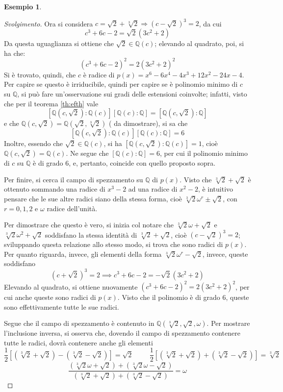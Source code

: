 \documentclass[11pt, a4paper]{scrartcl}
\newenvironment{svolgimento}{\renewcommand\qedsymbol{$\blacksquare$}\begin{proof}[Svolgimento]}{\end{proof}}
\theoremstyle{definition}
\newtheorem{esempio}{Esempio}
\numberwithin{esempio}{section}
\theoremstyle{definition}
\numberwithin{obs}{section}
\numberwithin{nota}{section}
\numberwithin{equation}{subsection}
\begin{document}
\begin{esempio}
\begin{svolgimento}
		Ora si considera $c=\sqrt{2} +\sqrt[3]{2} \Rightarrow (c-\sqrt{2} )^3 = 2$, da cui
		\[
		c^3 + 6c - 2 = \sqrt{2} (3c^2  +2)
		\] 
		Da questa uguaglianza si ottiene che $\sqrt{2} \in \mathbb{Q}(c)$; elevando al quadrato, poi, si ha che:
		\[
			(c^3 + 6c - 2) ^2 = 2(3c^2 + 2)^2
		\] 
		Si \`e trovato, quindi, che $c$ \`e radice di $p(x) = x^6 - 6x^4 - 4 x^3 + 12x^2-24x - 4$.
		Per capire se questo \`e irriducibile, quindi per capire se \`e polinomio minimo di $c$ su $\mathbb{Q}$, si pu\`o fare un'osservazione sui gradi delle estensioni coinvolte; infatti, visto che per il teorema \ref{th:efth} vale
		\[
			[\mathbb{Q}(c,\sqrt{2} ) : \mathbb{Q}(c)] [\mathbb{Q}(c):\mathbb{Q}] = [\mathbb{Q}(c,\sqrt{2} ) : \mathbb{Q}]
		\] 
		e che $\mathbb{Q}(c,\sqrt{2} ) = \mathbb{Q}(\sqrt{2} ,\sqrt[3]{2} )$ ({\color{red} da dimostrare}), si sa che
\[
[\mathbb{Q}(c,\sqrt{2} ) : \mathbb{Q}(c)] [\mathbb{Q}(c):\mathbb{Q}] =6
\] 
Inoltre, essendo che $\sqrt{2} \in \mathbb{Q}(c)$, si ha $[\mathbb{Q}(c,\sqrt{2} ) : \mathbb{Q}(c)] = 1$, cio\`e $\mathbb{Q}(c,\sqrt{2} ) = \mathbb{Q}(c)$.
Ne segue che $[\mathbb{Q}(c) : \mathbb{Q}] = 6$, per cui il polinomio minimo di $c$ su $\mathbb{Q}$ \`e di grado $6$, e, pertanto, coincide con quello proposto sopra.

Per finire, si cerca il campo di spezzamento su $\mathbb{Q}$ di $p(x)$. 
Visto che $\sqrt[3]{2} + \sqrt{2} $ \`e ottenuto sommando una radice di $x^3 - 2$ ad una radice di $x^2 - 2$, \`e intuitivo pensare che le sue altre radici siano della stessa forma, cio\`e $\sqrt[3]{2}\omega^r \pm \sqrt{2} $, con $r = 0,1,2$ e $\omega$ radice dell'unit\`a.

Per dimostrare che questo \`e vero, si inizia col notare che $\sqrt[3]{2} \omega + \sqrt{2} $ e $\sqrt[3]{2} \omega^2 + \sqrt{2} $ soddisfano la stessa identit\`a di $\sqrt[3]{2} +\sqrt{2} $, cio\`e $(c-\sqrt{2} )^3 = 2$; sviluppando questa relazione allo stesso modo, si trova che sono radici di $p(x)$.
Per quanto riguarda, invece, gli elementi della forma $\sqrt[3]{2} \omega^r - \sqrt{2} $, invece, queste soddisfano
\[
	(c+\sqrt{2} )^3 = 2\implies c^3 + 6c - 2 = -\sqrt{2} (3c^2 + 2)
\] 
Elevando al quadrato, si ottiene nuovamente $(c^3 + 6c - 2)^2 = 2 (3c^2 +2)^2$, per cui anche queste sono radici di $p(x)$.
Visto che il polinomio \`e di grado $6$, queste sono effettivamente tutte le sue radici.

Segue che il campo di spezzamento \`e contenuto in $\mathbb{Q}(\sqrt[3]{2}, \sqrt{2} ,\omega) $.
Per mostrare l'inclusione inversa, si osserva che, dovendo il campo di spezzamento contenere tutte le radici, dovr\`a contenere anche gli elementi 
\[
	\frac{1}{2}\left[ (\sqrt[3]{2} +\sqrt{2} ) - (\sqrt[3]{2} -\sqrt{2} )\right] = \sqrt{2} \hspace{1cm}\frac{1}{2}\left[ (\sqrt[3]{2} +\sqrt{2} ) + (\sqrt[3]{2} -\sqrt{2} )\right] = \sqrt[3]{2}
\] 
\[
\frac{(\sqrt[3]{2}\omega +\sqrt{2} ) + (\sqrt[3]{2}\omega -\sqrt{2} )}{(\sqrt[3]{2} +\sqrt{2} ) + (\sqrt[3]{2} -\sqrt{2} )}=\omega
\] 
	\end{svolgimento}
\end{esempio}
\end{document}
